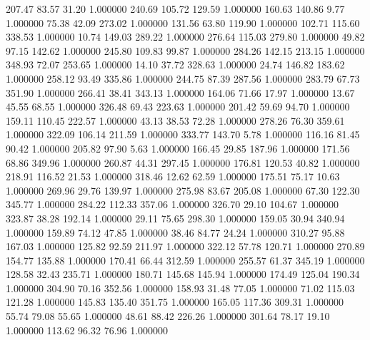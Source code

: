     207.47     83.57     31.20  1.000000
    240.69    105.72    129.59  1.000000
    160.63    140.86      9.77  1.000000
     75.38     42.09    273.02  1.000000
    131.56     63.80    119.90  1.000000
    102.71    115.60    338.53  1.000000
     10.74    149.03    289.22  1.000000
    276.64    115.03    279.80  1.000000
     49.82     97.15    142.62  1.000000
    245.80    109.83     99.87  1.000000
    284.26    142.15    213.15  1.000000
    348.93     72.07    253.65  1.000000
     14.10     37.72    328.63  1.000000
     24.74    146.82    183.62  1.000000
    258.12     93.49    335.86  1.000000
    244.75     87.39    287.56  1.000000
    283.79     67.73    351.90  1.000000
    266.41     38.41    343.13  1.000000
    164.06     71.66     17.97  1.000000
     13.67     45.55     68.55  1.000000
    326.48     69.43    223.63  1.000000
    201.42     59.69     94.70  1.000000
    159.11    110.45    222.57  1.000000
     43.13     38.53     72.28  1.000000
    278.26     76.30    359.61  1.000000
    322.09    106.14    211.59  1.000000
    333.77    143.70      5.78  1.000000
    116.16     81.45     90.42  1.000000
    205.82     97.90      5.63  1.000000
    166.45     29.85    187.96  1.000000
    171.56     68.86    349.96  1.000000
    260.87     44.31    297.45  1.000000
    176.81    120.53     40.82  1.000000
    218.91    116.52     21.53  1.000000
    318.46     12.62     62.59  1.000000
    175.51     75.17     10.63  1.000000
    269.96     29.76    139.97  1.000000
    275.98     83.67    205.08  1.000000
     67.30    122.30    345.77  1.000000
    284.22    112.33    357.06  1.000000
    326.70     29.10    104.67  1.000000
    323.87     38.28    192.14  1.000000
     29.11     75.65    298.30  1.000000
    159.05     30.94    340.94  1.000000
    159.89     74.12     47.85  1.000000
     38.46     84.77     24.24  1.000000
    310.27     95.88    167.03  1.000000
    125.82     92.59    211.97  1.000000
    322.12     57.78    120.71  1.000000
    270.89    154.77    135.88  1.000000
    170.41     66.44    312.59  1.000000
    255.57     61.37    345.19  1.000000
    128.58     32.43    235.71  1.000000
    180.71    145.68    145.94  1.000000
    174.49    125.04    190.34  1.000000
    304.90     70.16    352.56  1.000000
    158.93     31.48     77.05  1.000000
     71.02    115.03    121.28  1.000000
    145.83    135.40    351.75  1.000000
    165.05    117.36    309.31  1.000000
     55.74     79.08     55.65  1.000000
     48.61     88.42    226.26  1.000000
    301.64     78.17     19.10  1.000000
    113.62     96.32     76.96  1.000000

